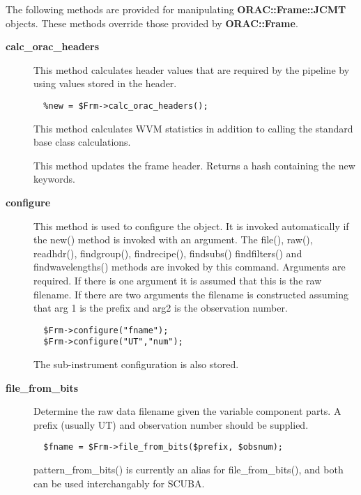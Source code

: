 \begin{description}
The following methods are provided for manipulating
\textbf{ORAC::Frame::JCMT} objects. These methods override those
provided by \textbf{ORAC::Frame}.

\begin{description}

\item[{\textbf{calc\_orac\_headers}}] \mbox{}

This method calculates header values that are required by the
pipeline by using values stored in the header.

\begin{verbatim}
  %new = $Frm->calc_orac_headers();
\end{verbatim}


This method calculates WVM statistics in addition to calling
the standard base class calculations.



This method updates the frame header.
Returns a hash containing the new keywords.


\item[{\textbf{configure}}] \mbox{}

This method is used to configure the object. It is invoked
automatically if the new() method is invoked with an argument. The
file(), raw(), readhdr(), findgroup(), findrecipe(), findsubs() 
findfilters() and findwavelengths() methods are
invoked by this command. Arguments are required.
If there is one argument it is assumed that this is the
raw filename. If there are two arguments the filename is
constructed assuming that arg 1 is the prefix and arg2 is the
observation number.

\begin{verbatim}
  $Frm->configure("fname");
  $Frm->configure("UT","num");
\end{verbatim}


The sub-instrument configuration is also stored.


\item[{\textbf{file\_from\_bits}}] \mbox{}

Determine the raw data filename given the variable component
parts. A prefix (usually UT) and observation number should
be supplied.

\begin{verbatim}
  $fname = $Frm->file_from_bits($prefix, $obsnum);
\end{verbatim}


pattern\_from\_bits() is currently an alias for file\_from\_bits(),
and both can be used interchangably for SCUBA.



\end{description}
\end{description}

